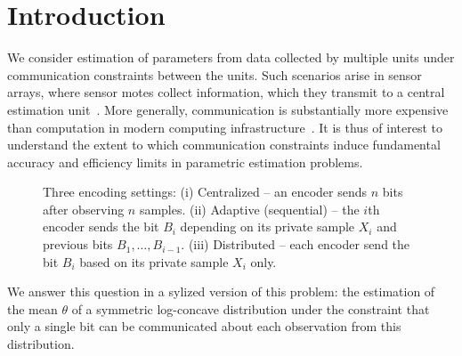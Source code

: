 
\section{Introduction}
\label{sec:Intro}

We consider estimation of parameters from data collected by multiple units
under communication constraints between the units.  Such scenarios arise in
sensor arrays, where sensor motes collect information, which they transmit
to a central estimation unit~\cite{LesserOrTa03,LiWoHuSa02}. More generally,
communication is substantially more expensive than computation in modern
computing infrastructure~\cite{FullerMi11}.  It is thus of interest to
understand the extent to which communication constraints induce fundamental
accuracy and efficiency limits in parametric estimation problems.
\begin{figure*}
  
  \caption{\label{fig:setup} Three encoding settings: (i) Centralized -- an
    encoder sends $n$ bits after observing $n$ samples. (ii) Adaptive
    (sequential) -- the $i$th encoder sends the bit $B_i$ depending on its
    private sample $X_i$ and previous bits $B_1,\ldots,B_{i-1}$. (iii)
    Distributed -- each encoder send the bit $B_i$ based on its private
    sample $X_i$ only.}
\end{figure*}

We answer this question in a sylized version of this problem: the estimation
of the mean $\theta$ of a symmetric log-concave distribution under the
constraint that only a single bit can be communicated about each observation
from this distribution.


